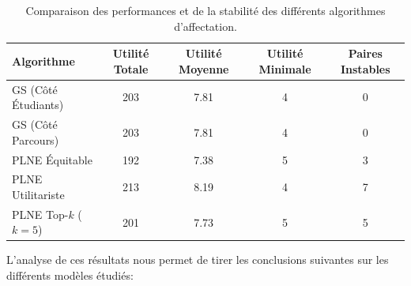 \documentclass{article}
\begin{document}
\begin{table}[htbp]
  \centering
  \renewcommand{\arraystretch}{1.2}
  \caption{Comparaison des performances et de la stabilité des différents algorithmes d'affectation.}
  \begin{tabular}{|l|c|c|c|c|}
    \hline
    \textbf{Algorithme} & \textbf{Utilité Totale} & \textbf{Utilité Moyenne} & \textbf{Utilité Minimale} & \textbf{Paires Instables} \\
    \hline
    GS (Côté Étudiants) & 203 & 7.81 & 4 & 0 \\
    \hline
    GS (Côté Parcours) & 203 & 7.81 & 4 & 0 \\
    \hline
    PLNE Équitable  & 192 & 7.38 & 5 & 3 \\
    \hline
    PLNE Utilitariste  & 213 & 8.19 & 4 & 7 \\
    \hline
    PLNE Top-$k$ ($k=5$) & 201 & 7.73 & 5 & 5 \\
    \hline
  \end{tabular}
  \label{tab:comparaison_algos}
\end{table}

L'analyse de ces résultats nous permet de tirer les conclusions suivantes sur les différents modèles étudiés:
\end{document}
